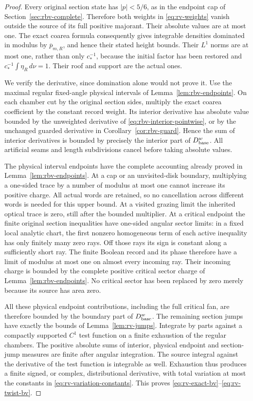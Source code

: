 \begin{proof}
Every original section state has $|p|<5/6$, as in the endpoint cap
of Section~\ref{sec:rbv-complete}. Therefore both weights in
\eqref{eq:rv-weights} vanish outside the source of its full positive
majorant. Their absolute values are at most one. The exact coarea
formula consequently gives integrable densities dominated in modulus
by $\overline p_{m,R}$, and hence their stated height bounds.
Their $L^1$ norms are at most one, rather than only $c_*^{-1}$,
because the initial factor has been restored and
$c_*^{-1}\int\eta_R\,d\nu=1$. Their roof and support are the
actual ones.

We verify the derivative, since domination alone would not prove it.
Use the maximal regular fixed-angle physical intervals of
Lemma~\ref{lem:rbv-endpoints}. On each chamber cut by the original
section sides, multiply the exact coarea coefficient by the constant
record weight. Its interior derivative has absolute value bounded
by the unweighted derivative of \eqref{eq:rbv-interior-pointwise},
or by the unchanged guarded derivative in
Corollary~\ref{cor:rbv-guard}. Hence the sum of interior derivatives
is bounded by precisely the interior part of $D_{\rm base}^{w}$.
All artificial seams and length subdivisions cancel before taking
absolute values.

The physical interval endpoints have the complete accounting already
proved in Lemma~\ref{lem:rbv-endpoints}. At a cap or an unvisited-disk
boundary, multiplying a one-sided trace by a number of modulus at most
one cannot increase its positive charge. All actual words are retained,
so no cancellation across different words is needed for this upper
bound. At a visited grazing limit the inherited optical trace is
zero, still after the bounded multiplier. At a critical endpoint the
finite original section inequalities have one-sided angular sector
limits: in a fixed local analytic chart, the first nonzero homogeneous
term of each active inequality has only finitely many zero rays.
Off those rays its sign is constant along a sufficiently short ray.
The finite Boolean record and its phase therefore have a limit of
modulus at most one on almost every incoming ray. Their incoming
charge is bounded by the complete positive critical sector charge of
Lemma~\ref{lem:rbv-endpoints}. No critical sector has been replaced
by zero merely because its source has area zero.

All these physical endpoint contributions, including the full
critical fan, are therefore bounded by the boundary part of
$D_{\rm base}^{w}$. The remaining section jumps have exactly the
bounds of Lemma~\ref{lem:rv-jumps}. Integrate by parts against a
compactly supported $C^1$ test function on a finite exhaustion of
the regular chambers. The positive absolute sums of interior,
physical endpoint and section-jump measures are finite after angular
integration. The source integral against the derivative of the test
function is integrable as well. Exhaustion thus produces a finite
signed, or complex, distributional derivative, with total variation
at most the constants in \eqref{eq:rv-variation-constants}.
This proves \eqref{eq:rv-exact-bv}--\eqref{eq:rv-twist-bv}.


\end{proof}
